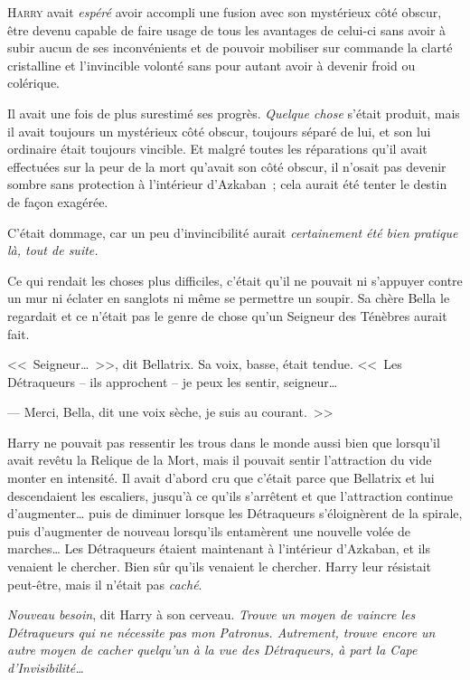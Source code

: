 
\lettrine{H}{arry} avait \emph{espéré} avoir accompli une fusion avec son mystérieux côté obscur, être devenu capable de faire usage de tous les avantages de celui-ci sans avoir à subir aucun de ses inconvénients et de pouvoir mobiliser sur commande la clarté cristalline et l'invincible volonté sans pour autant avoir à devenir froid ou colérique.

Il avait une fois de plus surestimé ses progrès. \emph{Quelque chose} s'était produit, mais il avait toujours un mystérieux côté obscur, toujours séparé de lui, et son lui ordinaire était toujours vincible. Et malgré toutes les réparations qu'il avait effectuées sur la peur de la mort qu'avait son côté obscur, il n'osait pas devenir sombre sans protection à l'intérieur d'Azkaban~; cela aurait été tenter le destin de façon exagérée.

C'était dommage, car un peu d'invincibilité aurait \emph{certainement été bien pratique là, tout de suite.}

Ce qui rendait les choses plus difficiles, c'était qu'il ne pouvait ni s'appuyer contre un mur ni éclater en sanglots ni même se permettre un soupir. Sa chère Bella le regardait et ce n'était pas le genre de chose qu'un Seigneur des Ténèbres aurait fait.

<<~Seigneur…~>>, dit Bellatrix. Sa voix, basse, était tendue. <<~Les Détraqueurs -- ils approchent -- je peux les sentir, seigneur…

--- Merci, Bella, dit une voix sèche, je suis au courant.~>>

Harry ne pouvait pas ressentir les trous dans le monde aussi bien que lorsqu'il avait revêtu la Relique de la Mort, mais il pouvait sentir l'attraction du vide monter en intensité. Il avait d'abord cru que c'était parce que Bellatrix et lui descendaient les escaliers, jusqu'à ce qu'ils s'arrêtent et que l'attraction continue d'augmenter… puis de diminuer lorsque les Détraqueurs s'éloignèrent de la spirale, puis d'augmenter de nouveau lorsqu'ils entamèrent une nouvelle volée de marches… Les Détraqueurs étaient maintenant à l'intérieur d'Azkaban, et ils venaient le chercher. Bien sûr qu'ils venaient le chercher. Harry leur résistait peut-être, mais il n'était pas \emph{caché}.

\emph{Nouveau besoin}, dit Harry à son cerveau. \emph{Trouve un moyen de vaincre les Détraqueurs qui ne nécessite pas mon Patronus. Autrement, trouve encore un autre moyen de cacher quelqu'un à la vue des Détraqueurs, à part la Cape d'Invisibilité…}

